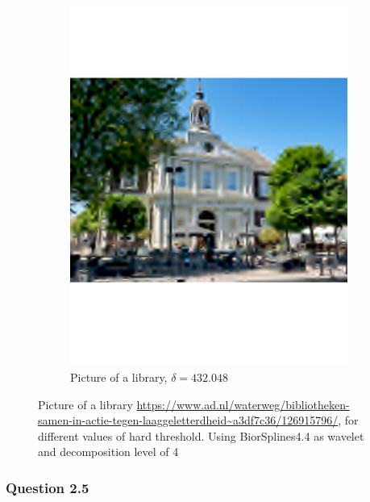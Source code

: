 \documentclass[a4paper]{article}
\begin{document}
\begin{figure}[H]
\begin{subfigure}{0.49\textwidth}
	\includegraphics[trim={4cm 8cm 4cm 8cm},clip,width=1\textwidth]{Images/BibBad.pdf}
	\caption{Picture of a library, $\delta = 432.048$}
	\label{sub:BibBad}
\end{subfigure}
	\caption{Picture of a library \url{https://www.ad.nl/waterweg/bibliotheken-samen-in-actie-tegen-laaggeletterdheid~a3df7c36/126915796/}, for different values of hard threshold. Using BiorSplines4.4 as wavelet and decomposition level of 4}
	\label{fig:Bib}
\end{figure}

    \subsubsection{Question 2.5} \label{subsubsec:stdWave}
\end{document}
